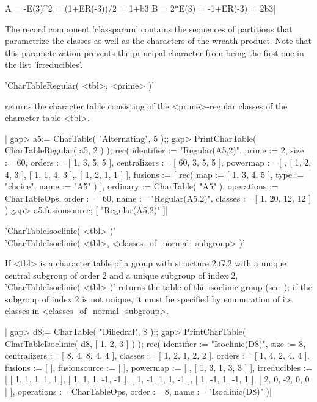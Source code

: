     A = -E(3)^2
      = (1+ER(-3))/2 = 1+b3
    B = 2*E(3)
      = -1+ER(-3) = 2b3|

\medskip

The record component 'classparam' contains the sequences of partitions
that parametrize the classes as well as the characters of the wreath
product. Note that this parametrization prevents the principal character
from being the first one in the list 'irreducibles'.

\medskip

%
%

'CharTableRegular( <tbl>, <prime> )'

returns the character table consisting of the <prime>-regular classes of
the character table <tbl>.

|    gap> a5:= CharTable( "Alternating", 5 );;
    gap> PrintCharTable( CharTableRegular( a5, 2 ) );
    rec( identifier := "Regular(A5,2)", prime := 2, size := 60, orders :=
    [ 1, 3, 5, 5 ], centralizers := [ 60, 3, 5, 5 ], powermap :=
    [ , [ 1, 2, 4, 3 ], [ 1, 1, 4, 3 ],, [ 1, 2, 1, 1 ] ], fusions :=
    [ rec(
          map := [ 1, 3, 4, 5 ],
          type := "choice",
          name := "A5" )
     ], ordinary := CharTable( "A5" ), operations := CharTableOps, order :\
    = 60, name := "Regular(A5,2)", classes := [ 1, 20, 12, 12 ] )
    gap> a5.fusionsource;
    [ "Regular(A5,2)" ]|

\Section{CharTableIsoclinic}%

'CharTableIsoclinic( <tbl> )'\\
'CharTableIsoclinic( <tbl>, <classes\_of\_normal\_subgroup> )'

If <tbl> is a character table of a group with structure $2.G.2$ with a
unique central subgroup of order 2 and a unique subgroup of index 2,
'CharTableIsoclinic( <tbl> )' returns the table of the isoclinic group
(see~\cite[Chapter 6, Section 7]{CCN85});
if the subgroup of index 2 is not unique, it must be specified by
enumeration of its classes in <classes\_of\_normal\_subgroup>.

|    gap> d8:= CharTable( "Dihedral", 8 );;
    gap> PrintCharTable( CharTableIsoclinic( d8, [ 1, 2, 3 ] ) );
    rec( identifier := "Isoclinic(D8)", size := 8, centralizers :=
    [ 8, 4, 8, 4, 4 ], classes := [ 1, 2, 1, 2, 2 ], orders :=
    [ 1, 4, 2, 4, 4 ], fusions := [  ], fusionsource := [  ], powermap :=
    [ , [ 1, 3, 1, 3, 3 ] ], irreducibles :=
    [ [ 1, 1, 1, 1, 1 ], [ 1, 1, 1, -1, -1 ], [ 1, -1, 1, 1, -1 ],
      [ 1, -1, 1, -1, 1 ], [ 2, 0, -2, 0, 0 ]
     ], operations := CharTableOps, order := 8, name := "Isoclinic(D8)" )|


